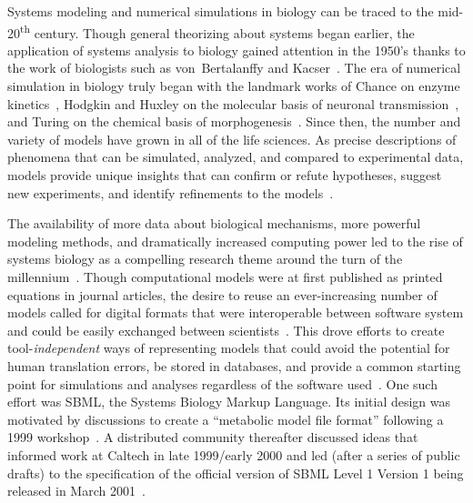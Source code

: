 \documentclass{sbml-paper}
\begin{document}
Systems modeling and numerical simulations in biology can be traced to the mid-20\textsuperscript{th} century. Though general theorizing about systems began earlier, the application of systems analysis to biology gained attention in the 1950's thanks to the work of biologists such as von~Bertalanffy and Kacser~\citep{Von_Bertalanffy1950-dy, Von_Bertalanffy1950-wa, Kacser1957-ox}. The era of numerical simulation in biology truly began with the landmark works of Chance on enzyme kinetics~\citep{chance1952mechanism, chance1940kinetics}, Hodgkin and Huxley on the molecular basis of neuronal transmission~\citep{hodgkin1952quantitative}, and Turing on the chemical basis of morphogenesis~\citep{turing1990chemical}. Since then, the number and variety of models have grown in all of the life sciences. As precise descriptions of phenomena that can be simulated, analyzed, and compared to experimental data, models provide unique insights that can confirm or refute hypotheses, suggest new experiments, and identify refinements to the models~\citep{Heinrich1996, le_novere_2015}.

The availability of more data about biological mechanisms, more powerful modeling methods, and dramatically increased computing power led to the rise of systems biology as a compelling research theme around the turn of the millennium~\citep{kitano2000perspectives, ideker2001new}. Though computational models were at first published as printed equations in journal articles, the desire to reuse an ever-increasing number of models called for digital formats that were interoperable between software system and could be easily exchanged between scientists~\citep[topics of interest as early as the 1960's; c.f.][]{Garfinkel1969construction}. This drove efforts to create tool-\emph{independent} ways of representing models that could avoid the potential for human translation errors, be stored in databases, and provide a common starting point for simulations and analyses regardless of the software used~\citep{Lloyd2004-fd, Goddard2001-ix, hucka_2001}.  One such effort was SBML, the Systems Biology Markup Language. Its initial design was motivated by discussions to create a ``metabolic model file format'' following a 1999 workshop~\citep{Cornish-Bowden2000technological, kell2008the}. A distributed community thereafter discussed ideas that informed work at Caltech in late 1999/early 2000 and led (after a series of public drafts) to the specification of the official version of SBML Level 1 Version 1 being released in March 2001~\citep{hucka_2003}.
\end{document}
